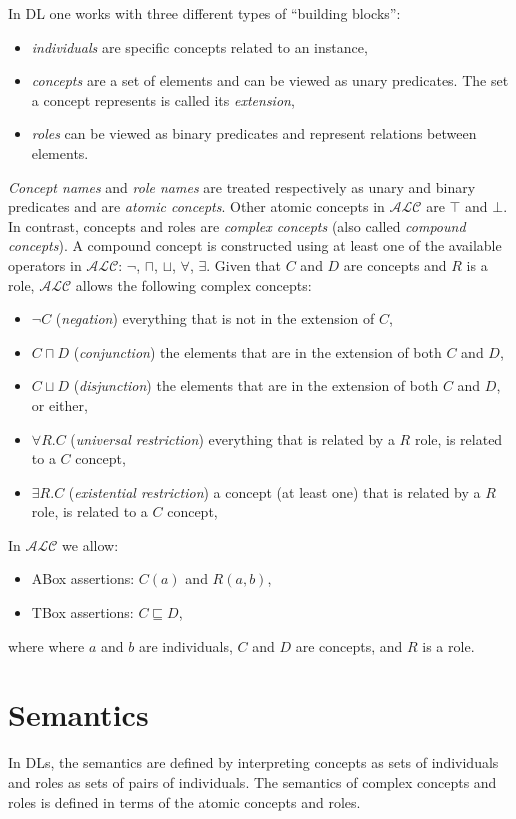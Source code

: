 In DL one works with three different types of ``building blocks'':
\begin{itemize}
    \item \textit{individuals} are specific concepts related to an instance,
    \item \textit{concepts} are a set of elements and can be viewed as unary predicates. The set a concept represents is called its \textit{extension},
    \item \textit{roles} can be viewed as binary predicates and represent relations between elements.
\end{itemize}
\textit{Concept names} and \textit{role names} are treated respectively as unary and binary predicates and are \textit{atomic concepts}. Other atomic concepts in $\mathcal{ALC}$ are $\top$ and $\bot$. In contrast, concepts and roles are \textit{complex concepts} (also called \textit{compound concepts}). A compound concept is constructed using at least one of the available operators in $\mathcal{ALC}$: $\neg$, $\sqcap$, $\sqcup$, $\forall$, $\exists$. Given that $C$ and $D$ are concepts and $R$ is a role, $\mathcal{ALC}$ allows the following complex concepts:
\begin{itemize}
    \item $\neg C$ (\textit{negation}) everything that is not in the extension of $C$,
    \item $C\sqcap D$ (\textit{conjunction}) the elements that are in the extension of both $C$ and $D$,
    \item $C\sqcup D$ (\textit{disjunction}) the elements that are in the extension of both $C$ and $D$, or either,
    \item $\forall R.C$ (\textit{universal restriction})  everything that is related by a $R$ role, is related to a $C$ concept,
    \item $\exists R.C$ (\textit{existential restriction}) a concept (at least one) that is related by a $R$ role, is related to a $C$ concept,
\end{itemize}

In $\mathcal{ALC}$ we allow:
\begin{itemize}
    \item ABox assertions: $C(a)$ and $R(a, b)$,
    \item TBox assertions: $C \sqsubseteq D$,
\end{itemize}
where where $a$ and $b$ are individuals, $C$ and $D$ are concepts, and $R$ is a role.

\section{Semantics}
In DLs, the semantics are defined by interpreting concepts as sets of individuals and roles as sets of pairs of individuals. The semantics of complex concepts and roles is defined in terms of the atomic concepts and roles.


